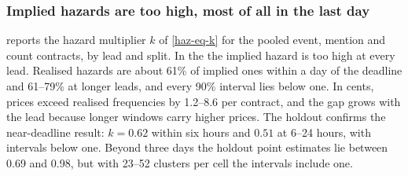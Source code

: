 
\subsubsection{Implied hazards are too high, most of all in the last day}\label{haz-res-calib}

 reports the hazard multiplier $k$ of \cref{haz-eq-k} for the pooled event,
mention and count contracts, by lead and split. In the \estim{} the implied hazard is too high at
every lead. Realised hazards are about 61\% of implied ones within a day of the deadline and 61--79\%
at longer leads, and every 90\% interval lies below one. In cents, prices exceed realised frequencies
by 1.2--8.6\cents{} per contract, and the gap grows with the lead because longer windows carry
higher prices. The holdout confirms the near-deadline result: $k=0.62$ within six hours and $0.51$ at
6--24 hours, with intervals below one. Beyond three days the holdout point estimates lie between 0.69
and 0.98, but with 23--52 clusters per cell the intervals include one.

